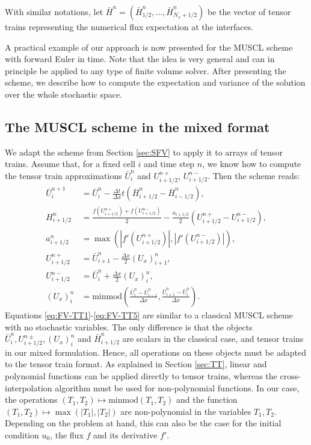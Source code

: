 \documentclass{article}
\newcommand{\minmod}{ \text{minmod} }
\begin{document}
With similar notations, let  $\bar{H}^n=(\bar{H}^n_{1/2},\dots,\bar{H}^n_{N_x+1/2})$ be
the vector of tensor trains representing the numerical flux expectation at the interfaces. 

A practical example of our approach is now presented for the MUSCL scheme with forward Euler in time. 
Note that the idea is very general and can in principle be applied to any type of finite volume solver. 
After presenting the scheme, we describe how to compute the expectation and variance of the solution over the whole stochastic space.


\subsection{The MUSCL scheme in the mixed format}
We adapt the scheme from Section \ref{sec:SFV} to apply it to arrays of tensor trains.
Assume that, for a fixed cell $i$ and time step $n$, we know how to compute the tensor train approximations
$\bar U^n _i$ and  $U_{i+1/2}^{n +}$,  $U_{i+1/2}^{n -}$. 
Then the scheme reads:
\begin{align}
    \label{eq:FV-TT1}
    \bar U_i^{n +1} 
    & = \bar U_i^n  - \frac{\Delta t}{\Delta x} t (\bar H_{i+1/2}^n  - \bar H_{i-1/2}^n ),
    \\[5pt]
    H_{i+1/2}^n  
    & = \frac{ f\left( U_{i+1/2}^{n +} \right) + f\left( U_{i+1/2}^{n -} \right) }{2}
    - \frac{a_{i+1/2}}{2} \left(  U_{i+1/2}^{n +}  -  U_{i+1/2}^{n -}  \right),
    \\[5pt] 
    a_{i+1/2}^n
    & = \max \left(
        |f'(U_{i+1/2}^{n +})|, |f'(U_{i+1/2}^{n -})|
    \right), 
    \\
    U_{i+1/2}^{n +} 
    & = \bar U_{i+1}^n  - \frac{\Delta x}{2} (U_x)_{i+1}^n, 
    \\
    U_{i+1/2}^{n -} 
    & = \bar U_{i}^n  + \frac{\Delta x}{2} (U_x)_{i}^n, 
    \\
    (U_x)_{i}^n &= \minmod\left(
        \frac{\bar U_i^n - \bar U_{i-1}^n}{\Delta x},
        \frac{\bar U_{i+1}^n - \bar U_i^n}{\Delta x}
    \right) .
    \label{eq:FV-TT5}
\end{align}
Equations \eqref{eq:FV-TT1}-\eqref{eq:FV-TT5} are similar to a classical MUSCL scheme with no stochastic variables. 
The only difference is that the objects 
$\bar U_i^n , U_{i+1/2}^{n \pm}, (U_x)_i^n $ and $\bar H_{i+1/2}^n $ 
are scalars in the classical case, and tensor trains in our mixed formulation. 
Hence, all operations on these objects must be adapted to the tensor train format. 
As explained in Section \ref{sec:TT}, linear and polynomial functions can be applied directly to tensor trains, whereas the cross-interpolation algorithm must be used for non-polynomial functions. 
In our case, the operations $(T_1, T_2) \mapsto \minmod(T_1, T_2)$ and 
the function $(T_1, T_2) \mapsto \max(|T_1|, |T_2|)$ are non-polynomial in the variables $T_1, T_2$. 
Depending on the problem at hand, this can also be the case for the initial condition $u_0$, the flux $f$ and its derivative $f'$. 
\end{document}
